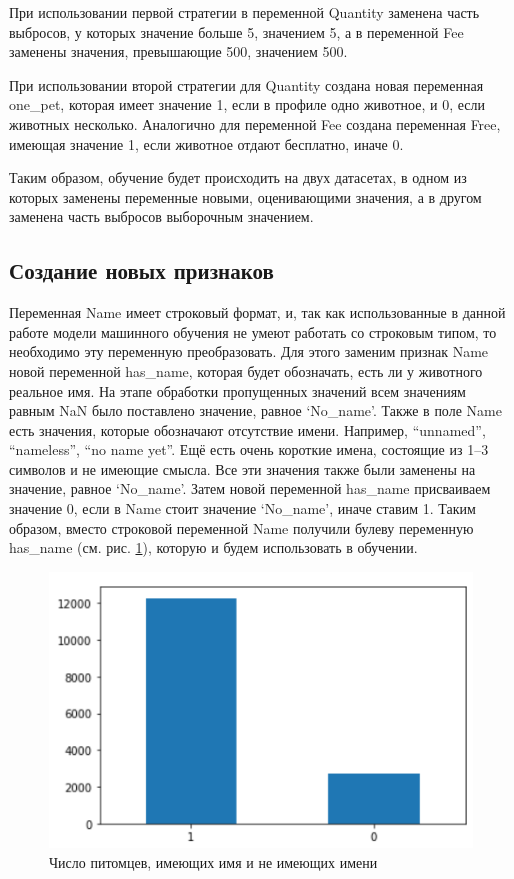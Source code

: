 \documentclass[14pt]{mmcs_article}
\begin{document}
При использовании первой стратегии в переменной Quantity заменена часть выбросов, у которых значение больше 5, значением 5, а в переменной Fee заменены значения, превышающие 500, значением 500.

При использовании второй стратегии для Quantity создана новая переменная one\_pet, которая имеет значение 1, если в профиле одно животное, и 0, если животных несколько. Аналогично для переменной Fee создана переменная Free, имеющая значение 1, если животное отдают бесплатно, иначе 0.

Таким образом, обучение будет происходить на двух датасетах, в одном из которых заменены переменные новыми, оценивающими значения, а в другом заменена часть выбросов выборочным значением.


\subsection{Создание новых признаков}

Переменная Name имеет строковый формат, и, так как использованные в данной работе модели машинного обучения не умеют работать со строковым типом, то необходимо эту переменную преобразовать. Для этого заменим признак Name новой переменной has\_name, которая будет обозначать, есть ли у животного реальное имя. На этапе обработки пропущенных значений всем значениям равным NaN было поставлено значение, равное `No\_name'. Также в поле Name есть значения, которые обозначают отсутствие имени. Например, ``unnamed'', ``nameless'', ``no name yet''. Ещё есть очень короткие имена, состоящие из 1–3 символов и не имеющие смысла. Все эти значения также были заменены на значение, равное `No\_name'. Затем новой переменной has\_name присваиваем значение 0, если в Name стоит значение `No\_name', иначе ставим 1. Таким образом, вместо строковой переменной Name получили булеву переменную has\_name (см. рис. \ref{analyse:hasname}), которую и будем использовать в обучении.

\begin{figure}[H]
	\centering
	\includegraphics[scale=1]{hasname.png}
	\caption{Число питомцев, имеющих имя и не имеющих имени}\label{analyse:hasname}
\end{figure}
\end{document}
